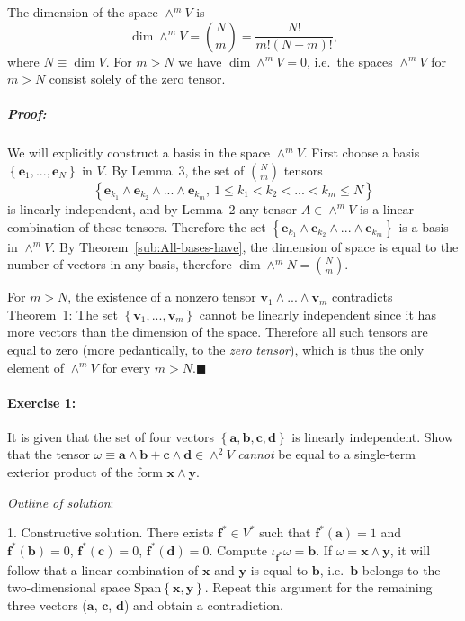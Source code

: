 The dimension of the space $\wedge^{m}V$ is \[
\dim\wedge^{m}V={N \choose m}=\frac{N!}{m!\left(N-m\right)!},\]
 where $N\equiv\dim V$. For $m>N$ we have $\dim\wedge^{m}V=0$,
i.e.~the spaces $\wedge^{m}V$ for $m>N$ consist solely of the zero
tensor. 


\subparagraph{Proof:}

We will explicitly construct a basis in the space $\wedge^{m}V$.
First choose a basis $\left\{ \mathbf{e}_{1},...,\mathbf{e}_{N}\right\} $
in $V$. By Lemma~3, the set of ${N \choose m}$ tensors\[
\left\{ \mathbf{e}_{k_{1}}\wedge\mathbf{e}_{k_{2}}\wedge...\wedge\mathbf{e}_{k_{m}},\:1\leq k_{1}<k_{2}<...<k_{m}\leq N\right\} \]
 is linearly independent, and by Lemma~2 any tensor $A\in\wedge^{m}V$
is a linear combination of these tensors. Therefore the set $\left\{ \mathbf{e}_{k_{1}}\wedge\mathbf{e}_{k_{2}}\wedge...\wedge\mathbf{e}_{k_{m}}\right\} $
is a basis in $\wedge^{m}V$. By Theorem~\ref{sub:All-bases-have},
the dimension of space is equal to the number of vectors in any basis,
therefore $\dim\wedge^{m}N={N \choose m}$.

For $m>N$, the existence of a nonzero tensor $\mathbf{v}_{1}\wedge...\wedge\mathbf{v}_{m}$
contradicts Theorem~1: The set $\left\{ \mathbf{v}_{1},...,\mathbf{v}_{m}\right\} $
cannot be linearly independent since it has more vectors than the
dimension of the space. Therefore all such tensors are equal to zero
(more pedantically, to the \emph{zero} \emph{tensor}), which is thus
the only element of $\wedge^{m}V$ for every $m>N$.\hfill{}$\blacksquare$


\paragraph{Exercise 1:}

It is given that the set of four vectors $\left\{ \mathbf{a},\mathbf{b},\mathbf{c},\mathbf{d}\right\} $
is linearly independent. Show that the tensor $\omega\equiv\mathbf{a}\wedge\mathbf{b}+\mathbf{c}\wedge\mathbf{d}\in\wedge^{2}V$
\emph{cannot} be equal to a single-term
exterior product of the form $\mathbf{x}\wedge\mathbf{y}$.

\emph{Outline of solution}: 

1. Constructive solution. There exists $\mathbf{f}^{*}\in V^{*}$
such that $\mathbf{f}^{*}(\mathbf{a})=1$ and $\mathbf{f}^{*}(\mathbf{b})=0$,
$\mathbf{f}^{*}(\mathbf{c})=0$, $\mathbf{f}^{*}(\mathbf{d})=0$.
Compute $\iota_{\mathbf{f}^{*}}\omega=\mathbf{b}$. If $\omega=\mathbf{x}\wedge\mathbf{y}$,
it will follow that a linear combination of $\mathbf{x}$ and $\mathbf{y}$
is equal to $\mathbf{b}$, i.e.~$\mathbf{b}$ belongs to the two-dimen\-sion\-al
space $\text{Span}\left\{ \mathbf{x},\mathbf{y}\right\} $. Repeat
this argument for the remaining three vectors ($\mathbf{a}$, $\mathbf{c}$,
$\mathbf{d}$) and obtain a contradiction.

